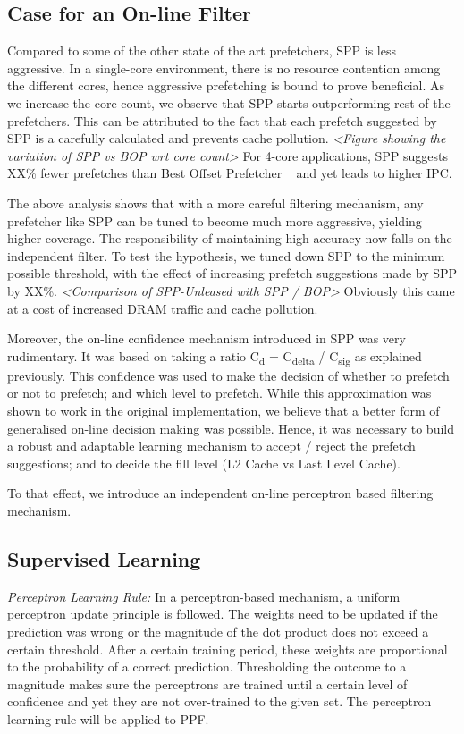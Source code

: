 \subsection{Case for an On-line Filter}
\label{Background-Case}

Compared to some of the other state of the art prefetchers, SPP is
less aggressive.  In a single-core environment, there is no resource
contention among the different cores, hence aggressive prefetching is bound to prove beneficial. 
As we increase the core
count, we observe that SPP starts outperforming rest of the prefetchers.  This
can be attributed to the fact that each prefetch suggested by SPP is a
carefully calculated and prevents cache pollution.  \textit{<Figure
showing the variation of SPP vs BOP wrt core count>} For 4-core applications,
SPP suggests XX\% fewer prefetches than Best Offset Prefetcher ~\cite{bop} and yet leads to higher IPC.

The above analysis shows that with a more careful filtering mechanism, any
prefetcher like SPP can be tuned to become much more aggressive, yielding higher coverage.  The responsibility of maintaining high accuracy now falls on the
independent filter.  To test the hypothesis, we tuned down SPP to the
minimum possible threshold, with the effect of increasing prefetch suggestions
made by SPP by XX\%.  \textit{<Comparison of SPP-Unleased with SPP / BOP>}
Obviously this came at a cost of increased DRAM traffic and cache pollution.

Moreover, the on-line confidence mechanism introduced in SPP was very
rudimentary.  It was based on taking a ratio C\textsubscript{d} =
C\textsubscript{delta} / C\textsubscript{sig} as explained previously. This
confidence was used to make the decision of whether to prefetch or not to
prefetch; and which level to prefetch.  While this approximation was shown to
work in the original implementation, we believe that a better form of
generalised on-line decision making was possible.  Hence, it was necessary to
build a robust and adaptable learning mechanism to accept / reject the
prefetch suggestions; and to decide the fill level (L2 Cache vs Last Level
Cache).

To that effect, we introduce an independent on-line perceptron based
filtering mechanism.

\subsection{Supervised Learning}

\textit{Perceptron Learning Rule:} In a perceptron-based mechanism, a uniform
perceptron update principle is followed.  The weights need to be updated if
the prediction was wrong or the magnitude of the dot product does not exceed
a certain threshold.  After a certain training period, these weights are
proportional to the probability of a correct prediction.  Thresholding the outcome to a
 magnitude makes sure the perceptrons are trained until a certain level of
confidence and yet they are not over-trained to the given set.  The perceptron 
learning rule will be applied to PPF.
